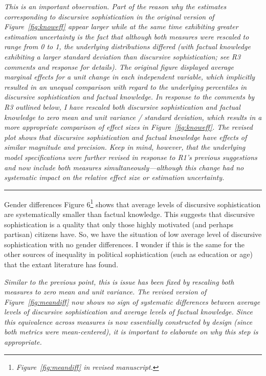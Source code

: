 \textit{This is an important observation. Part of the reason why the estimates corresponding to discursive sophistication in the original version of Figure~\ref{fig:knoweff} appear larger while at the same time exhibiting greater estimation uncertainty is the fact that although both measures were rescaled to range from 0 to 1, the underlying distributions differed (with factual knowledge exhibiting a larger standard deviation than discursive sophistication; see R3 comments and response for details). The original figure displayed average marginal effects for a unit change in each independent variable, which implicitly resulted in an unequal comparison with regard to the underlying percentiles in discursive sophistication and factual knowledge. In response to the comments by R3 outlined below, I have rescaled both discursive sophistication and factual knowledge to zero mean and unit variance / standard deviation, which results in a more appropriate comparison of effect sizes in Figure~\ref{fig:knoweff}. The revised plot shows that discursive sophistication and factual knowledge have effects of similar magnitude and precision. Keep in mind, however, that the underlying model specifications were further revised in response to R1's previous suggestions and now include both measures simultaneously---although this change had no systematic impact on the relative effect size or estimation uncertainty.}


\rule{\linewidth}{.01cm}

Gender differences Figure 6\footnote{\textit{Figure~\ref{fig:meandiff} in revised manuscript.}} shows that average levels of discursive sophistication are systematically smaller than factual knowledge. This suggests that discursive sophistication is a quality that only those highly motivated (and perhaps partisan) citizens have. So, we have the situation of low average level of discursive sophistication with no gender differences. I wonder if this is the same for the other sources of inequality in political sophistication (such as education or age) that the extant literature has found.

\textit{Similar to the previous point, this is issue has been fixed by rescaling both measures to zero mean and unit variance. The revised version of Figure~\ref{fig:meandiff} now shows no sign of systematic differences between average levels of discursive sophistication and average levels of factual knowledge. Since this equivalence across measures is now essentially constructed by design (since both metrics were mean-centered), it is important to elaborate on why this step is appropriate.}

